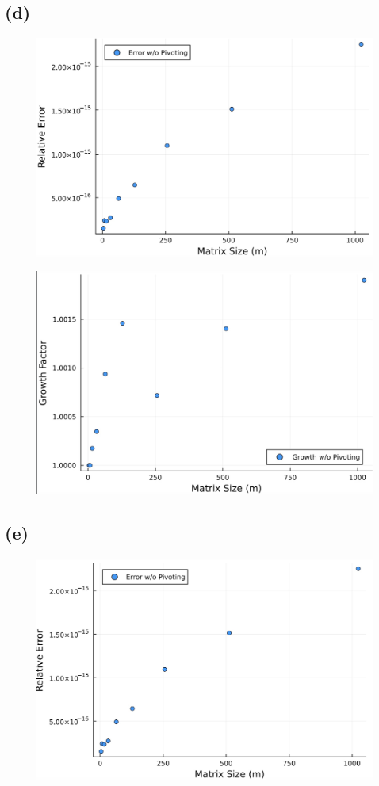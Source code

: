 \documentclass{article}
\begin{document}
\subsection{(d)}
\begin{figure}[H]
    \includegraphics[width=0.75\linewidth]{Image 2-20-24 at 07.51.jpeg}
    
    
\end{figure}
\begin{figure}[H]
    \includegraphics[width=0.75\linewidth]{Image 2-20-24 at 07.59.jpeg}
    
    
\end{figure}
\subsection{(e)}
\begin{figure}[H]
    \includegraphics[width=0.75\linewidth]{Image 2-20-24 at 08.06.jpeg}
\end{figure}
\end{document}

